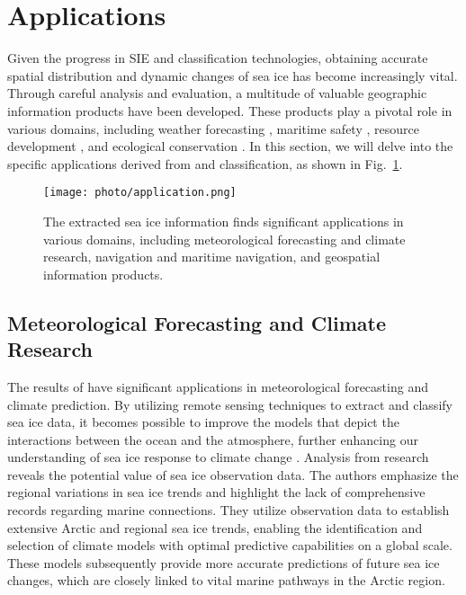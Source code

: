 \section{Applications}
\label{section:D}
Given the progress in SIE and classification technologies, obtaining accurate spatial distribution and dynamic changes of sea ice has become increasingly vital. Through careful analysis and evaluation, a multitude of valuable geographic information products have been developed. These products play a pivotal role in various domains, including weather forecasting \cite{178rogers2013future}, maritime safety \cite{167chang2015route}, resource development \cite{113gao2018sea}, and ecological conservation \cite{163chen2019assessments}. In this section, we will delve into the specific applications derived from  and classification, as shown in Fig.~\ref{application}.

\begin{figure}[!tbh]
  \begin{center}
  \texttt{[image: photo/application.png]}\\
  \caption{The extracted sea ice information finds significant applications in various domains, including meteorological forecasting and climate research, navigation and maritime navigation, and geospatial information products.}\label{application}
  \end{center}
\end{figure}

\subsection{Meteorological Forecasting and Climate Research}
The results of  have significant applications in meteorological forecasting and climate prediction. By utilizing remote sensing techniques to extract and classify sea ice data, it becomes possible to improve the models that depict the interactions between the ocean and the atmosphere, further enhancing our understanding of sea ice response to climate change \cite{176makynen2020satellite}. Analysis from research \cite{178rogers2013future} reveals the potential value of sea ice observation data. The authors emphasize the regional variations in sea ice trends and highlight the lack of comprehensive records regarding marine connections. They utilize observation data to establish extensive Arctic and regional sea ice trends, enabling the identification and selection of climate models with optimal predictive capabilities on a global scale. These models subsequently provide more accurate predictions of future sea ice changes, which are closely linked to vital marine pathways in the Arctic region.


